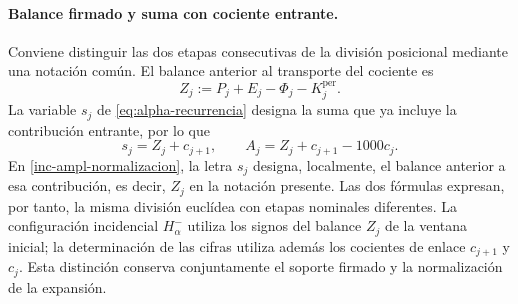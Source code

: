 \paragraph{Balance firmado y suma con cociente entrante.}
\label{ampl-alfa-z-s-aclaracion}
Conviene distinguir las dos etapas consecutivas de la división
posicional mediante una notación común. El balance anterior al transporte
del cociente es
\[
 Z_j:=P_j+E_j-\Phi_j-K_j^{\mathrm{per}}.
\]
La variable $s_j$ de \eqref{eq:alpha-recurrencia} designa la suma que ya
incluye la contribución entrante, por lo que
\[
 s_j=Z_j+c_{j+1},\qquad
 A_j=Z_j+c_{j+1}-1000c_j.
\]
En \eqref{inc-ampl-normalizacion}, la letra $s_j$ designa, localmente,
el balance anterior a esa contribución, es decir, $Z_j$ en la notación
presente. Las dos fórmulas expresan, por tanto, la misma división
euclídea con etapas nominales diferentes. La configuración incidencial
$H^-_\alpha$ utiliza los signos del balance $Z_j$ de la ventana inicial;
la determinación de las cifras utiliza además los cocientes de enlace
$c_{j+1}$ y $c_j$. Esta distinción conserva conjuntamente el soporte
firmado y la normalización de la expansión.
